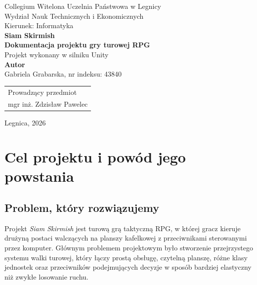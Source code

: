 \documentclass[12pt,a4paper]{article}
\begin{document}
\begin{titlepage}
\begin{center}
\large
    {\noindent Collegium Witelona Uczelnia Państwowa w Legnicy}\\
    {\noindent Wydział Nauk Technicznych i Ekonomicznych}\\
    {\noindent Kierunek: Informatyka}\\[2cm]
    \vspace{1cm}
    {\Huge\textbf{Siam Skirmish}}\\[0.4cm]
    {\Large\textbf{Dokumentacja projektu gry turowej RPG}}\\[0.8cm]
    {\large Projekt wykonany w silniku Unity}\\[3cm]
    {\large\textbf{Autor}}\\
    Gabriela Grabarska, nr indeksu: 43840\\[2.5cm]
\end{center}

\begin{flushright}
    \begin{tabular}{l}
        Prowadzący przedmiot\\
        mgr inż. Zdzisław Pawelec
    \end{tabular}
\end{flushright}

\vfill
\begin{center}
    {\noindent Legnica, 2026}
\end{center}
\end{titlepage}

\tableofcontents
\newpage

\section{Cel projektu i powód jego powstania}

\subsection{Problem, który rozwiązujemy}

Projekt \textit{Siam Skirmish} jest turową grą taktyczną RPG, w której gracz kieruje drużyną postaci walczących na planszy kafelkowej z przeciwnikami sterowanymi przez komputer. Głównym problemem projektowym było stworzenie przejrzystego systemu walki turowej, który łączy prostą obsługę, czytelną planszę, różne klasy jednostek oraz przeciwników podejmujących decyzje w sposób bardziej elastyczny niż zwykłe losowanie ruchu.
\end{document}
